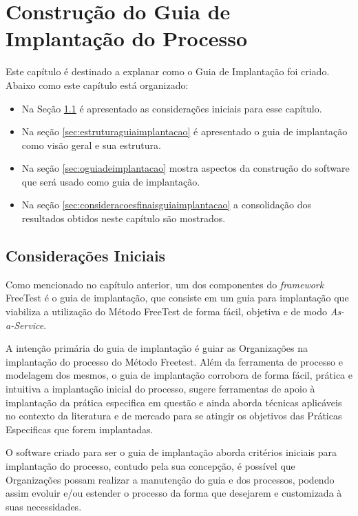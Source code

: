 \chapter{Construção do Guia de Implantação do Processo}
\label{sec:construcaoguiaimplantacao}

Este capítulo é destinado a explanar como o Guia de Implantação foi criado. Abaixo como este capítulo está organizado:

\begin{itemize}
\item Na Seção \ref{sec:consideracoesiniciais} é apresentado as considerações iniciais para esse capítulo.
\item Na seção \ref{sec:estruturaguiaimplantacao} é apresentado o guia de implantação como visão geral e sua estrutura.
\item Na seção \ref{sec:oguiadeimplantacao} mostra aspectos da construção do software que será usado como guia de implantação.
\item Na seção \ref{sec:consideracoesfinaisguiaimplantacao} a consolidação dos resultados obtidos neste capítulo são mostrados.
\end{itemize}

\section{Considerações Iniciais}
\label{sec:consideracoesiniciais}

Como mencionado no capítulo anterior, um dos componentes do \textit{framework} FreeTest é o guia de implantação, que consiste em um guia para implantação que viabiliza a utilização do Método FreeTest de forma fácil, objetiva e de modo \textit{As-a-Service}.

A intenção primária do guia de implantação é guiar as Organizações na implantação do processo do Método Freetest. Além da ferramenta de processo e modelagem dos mesmos, o guia de implantação corrobora de forma fácil, prática e intuitiva a implantação inicial do processo, sugere ferramentas de apoio à implantação da prática especifica em questão e ainda aborda técnicas aplicáveis no contexto da literatura e de mercado para se atingir os objetivos das Práticas Especificas que forem implantadas.

O software criado para ser o guia de implantação aborda critérios iniciais para implantação do processo, contudo pela sua concepção, é possível que Organizações possam realizar a manutenção do guia e dos processos, podendo assim evoluir e/ou estender o processo da forma que desejarem e customizada à suas necessidades.


